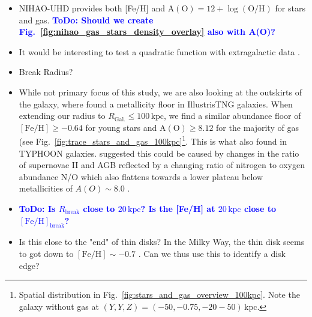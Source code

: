 \documentclass[fleqn,usenatbib]{mnras}
\newcommand{\ToDo}[1]{\textbf{\textcolor{blue}{ToDo: #1}}}
\begin{document}
\begin{itemize}
    \item NIHAO-UHD provides both [Fe/H] and $\mathrm{A(O)} = 12 + \log(\mathrm{O/H})$ for stars and gas. \ToDo{Should we create Fig.~\ref{fig:nihao_gas_stars_density_overlay} also with A(O)?}
    \item It would be interesting to test a quadratic function with extragalactic data \citep[e.g.][]{Chen2023, Bresolin2012}.
    \item Break Radius?
    \item While not primary focus of this study, we are also looking at the outskirts of the galaxy, where \citet{Garcia2023} found a metallicity floor in IllustrisTNG galaxies. When extending our radius to $R_\mathrm{Gal.} \leq 100\,\mathrm{kpc}$, we find a similar abundance floor of $\mathrm{[Fe/H]} \geq -0.64$ for young stars and $\mathrm{A(O)} \geq 8.12$ for the majority of gas (see Fig.~\ref{fig:trace_stars_and_gas_100kpc}\footnote{Spatial distribution in Fig.~\ref{fig:stars_and_gas_overview_100kpc}. Note the galaxy without gas at $(Y,Y,Z) = (-50,-0.75,-20-50)\,\mathrm{kpc}$.}. This is what \citet{Grasha2022} also found in TYPHOON galaxies. \citet{Grasha2022} suggested this could be caused by changes in the ratio of supernovae II and AGB reflected by a changing ratio of nitrogen to oxygen abundance N/O which also flattens towards a lower plateau below metallicities of $A(O) \sim 8.0$ \citep{Nicholls2017}.
    \item \ToDo{Is $R_\mathrm{break}$ close to $20\,\mathrm{kpc}$? Is the [Fe/H] at $20\,\mathrm{kpc}$ close to $\mathrm{[Fe/H]}_\mathrm{break}$?}
    \item Is this close to the "end" of thin disks? In the Milky Way, the thin disk seems to got down to $\mathrm{[Fe/H]} \sim -0.7$ \citep{Bensby2014, Buder2019}. Can we thus use this to identify a disk edge?
\end{itemize}

\end{document}
